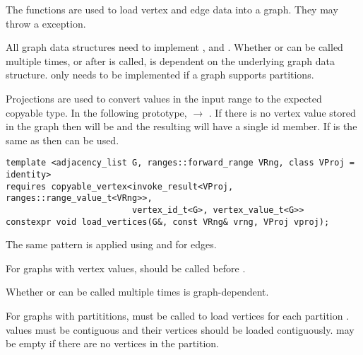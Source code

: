 The  functions are used to load vertex and edge data into a graph. They may throw a  exception.

All graph data structures need to implement ,  and . 
Whether  or  can be called multiple times, or after  is called, is dependent on the underlying graph data structure.
 only needs to be implemented if a graph supports partitions.

Projections are used to convert values in the input range to the expected copyable type. In the following  
prototype,  $\rightarrow$ .
If there is no vertex value stored in the graph then  will be  and the resulting 
 will have a single id member. If  is the same as
 then  can be used.

\begin{lstlisting}
template <adjacency_list G, ranges::forward_range VRng, class VProj = identity>
requires copyable_vertex<invoke_result<VProj, ranges::range_value_t<VRng>>,
                         vertex_id_t<G>, vertex_value_t<G>>
constexpr void load_vertices(G&, const VRng& vrng, VProj vproj);
\end{lstlisting}

The same pattern is applied using  and  for edges.

For graphs with vertex values,  should be called before .

Whether  or  can be called multiple times is graph-dependent.

For graphs with partititions,  must be called to load vertices for each 
partition .  values must be contiguous and their vertices should be loaded
contiguously.  may be empty if there are no vertices in the partition. 

